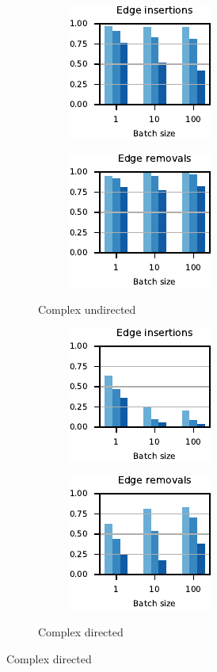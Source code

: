 \begin{figure}[tb]
\begin{subfigure}[t]{.5\textwidth}
\begin{subfigure}[t]{.5\textwidth}
\centering
\includegraphics{./sources/plots/dyn-topk/breakdown-undirected-small-diameter-addition.pdf}
\end{subfigure}\hfill
\begin{subfigure}[t]{.5\textwidth}
\centering
\includegraphics{./sources/plots/dyn-topk/breakdown-undirected-small-diameter-removal.pdf}
\end{subfigure}\hfill
\caption{Complex undirected}
\label{fig:dyn-topk-breakdown-cmplx-undir}
\end{subfigure}\hfill
%
%
\begin{subfigure}[t]{.5\textwidth}
\begin{subfigure}[t]{.5\textwidth}
\centering
\includegraphics{./sources/plots/dyn-topk/breakdown-directed-small-diameter-addition.pdf}
\end{subfigure}\hfill
\begin{subfigure}[t]{.5\textwidth}
\centering
\includegraphics{./sources/plots/dyn-topk/breakdown-directed-small-diameter-removal.pdf}
\end{subfigure}\hfill
\caption{Complex directed}
\label{fig:dyn-topk-breakdown-cmplx-dir}
\end{subfigure}\medskip


\end{figure}
